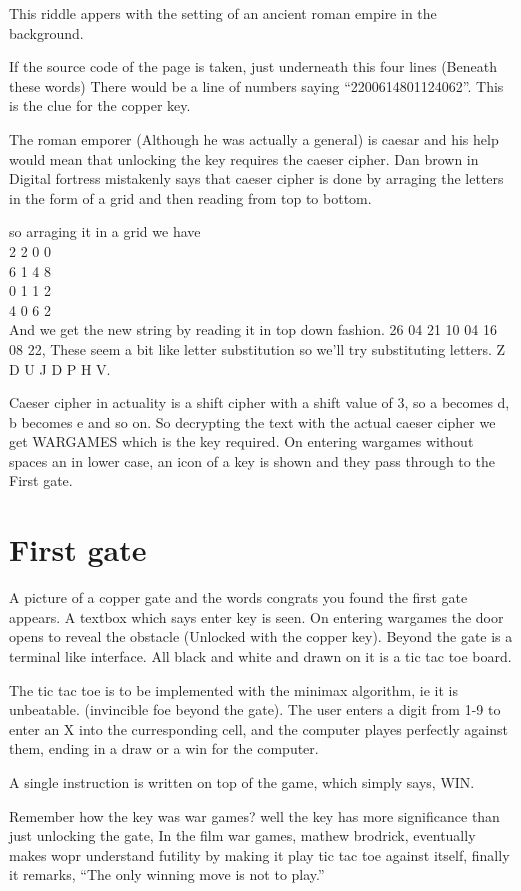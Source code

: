 \documentclass[12pt]{article}
\begin{document}
This riddle appers with the setting of an ancient roman empire in the background. 

If the source code of the page is taken, just underneath this four lines (Beneath these words) There would be a line of numbers saying ``2200614801124062''. This is the clue for the copper key. 

The roman emporer (Although he was actually a general) is caesar and his help would mean that unlocking the key requires the caeser cipher. Dan brown in Digital fortress mistakenly says that caeser cipher is done by arraging the letters in the form of a grid and then reading from top to bottom.

so arraging it in a grid we have\\
2 2 0 0\\
6 1 4 8\\
0 1 1 2\\
4 0 6 2\\

And we get the new string by reading it in top down fashion. 26 04 21 10 04 16 08 22, These seem a bit like letter substitution so we'll try substituting letters. Z D U J D P H V. 

Caeser cipher in actuality is a shift cipher with a shift value of 3, so a becomes d, b becomes e and so on. So decrypting the text with the actual caeser cipher we get WARGAMES which is the key required. On entering wargames without spaces an in lower case, an icon of a key is shown and they pass through to the First gate.

\section{First gate}
A picture of a copper gate and the words congrats you found the first gate appears. A textbox which says enter key is seen. On entering wargames the door opens to reveal the obstacle
 (Unlocked with the copper key). Beyond the gate is a terminal like interface. All black and white and drawn on it is a tic tac toe board.

The tic tac toe is to be implemented with the minimax algorithm, ie it is unbeatable. (invincible foe beyond the gate). The user enters a digit from 1-9 to enter an X into the curresponding cell, and the computer playes perfectly against them, ending in a draw or a win for the computer. 

A single instruction is written on top of the game, which simply says, WIN.

Remember how the key was war games? well the key has more significance than just unlocking the gate, In the film war games, mathew brodrick, eventually makes wopr understand futility by making it play tic tac toe against itself, finally it remarks, ``The only winning move is not to play.''
\end{document}
